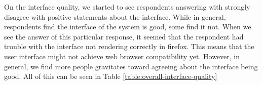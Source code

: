 \begin{center}
\label{table:overall-interface-quality}
\end{center}
\vspace{1cm}


On the interface quality, we started to see respondents answering with strongly disagree with positive statements about the interface. While in general, respondents find the interface of the system is good, some find it not. When we see the answer of this particular response, it seemed that the respondent had trouble with the interface not rendering correctly in firefox. This means that the user interface might not achieve web browser compatibility yet. However, in general, we find more people gravitates toward agreeing about the interface being good. All of this can be seen in Table \ref{table:overall-interface-quality}


